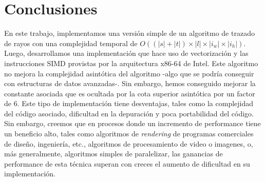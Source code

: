 \section{Conclusiones}


En este trabajo, implementamos una versión simple de un algoritmo de trazado de rayos con una complejidad temporal de $O((|s|+|t|) \times |l| \times |i_w| \times |i_h|)$. Luego, desarrollamos una implementación que hace uso de vectorización y las instrucciones SIMD provistas por la arquitectura x86-64 de Intel. Este algoritmo no mejora la complejidad asintótica del algoritmo -algo que se podría conseguir con estructuras de datos avanzadas-. Sin embargo, hemos conseguido mejorar la constante asociada que es ocultada por la cota superior asintótica por un factor de 6. Este tipo de implementación tiene desventajas, tales como la complejidad del código asociado, dificultad en la depuración y poca portabilidad del código. Sin embargo, creemos que en procesos donde un incremento de performance tiene un beneficio alto, tales como algoritmos de \emph{rendering} de programas comerciales de diseño, ingeniería, etc., algoritmos de procesamiento de video o imagenes, o, más generalmente, algoritmos simples de paralelizar, las ganancias de performance de esta técnica superan con creces el aumento de dificultad en su implementación.